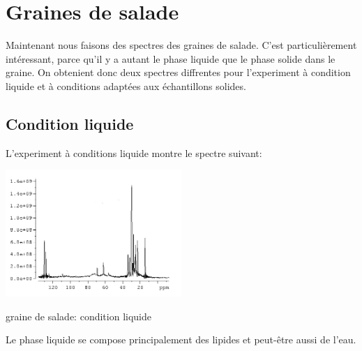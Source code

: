 \documentclass[a4paper,12pt]{scrartcl}
\begin{document}
 \section{Graines de salade}
Maintenant nous faisons des spectres des graines de salade. C'est particulièrement	 intéressant, parce qu'il y a 	 autant le phase liquide que le phase solide dans le graine. On obtenient donc deux spectres diffrentes pour l'experiment à condition liquide et à conditions adaptées aux échantillons solides.  
  \subsection{Condition liquide}
L'experiment à conditions liquide montre le spectre suivant: 
 \begin{figurehere}
    \center
    \includegraphics[width=0.5\textwidth]{bilder/graine_liquide.png}
    \caption{graine de salade: condition liquide}
   \end{figurehere}
Le phase liquide se compose principalement des lipides et peut-être aussi de l'eau. 
\end{document}
